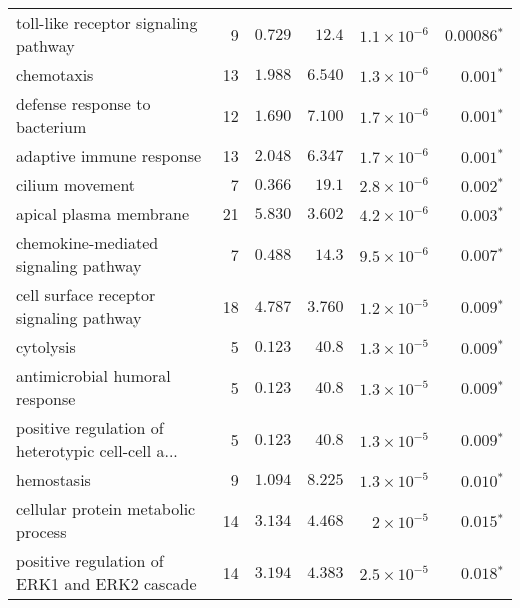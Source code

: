 \documentclass{article}
\begin{document}
\begin{table*}[!ht]
\begin{adjustbox}{width = 1\textwidth}
\begin{tabular}{|l|r|r|r|r|r|}
                toll-like receptor signaling pathway              & 9   & $ 0.729$ & $  12.4$   & $1.1\times 10^{-6}$  & $\bm{0.00086{^*}}$            \\
                chemotaxis                                        & 13  & $ 1.988$ & $ 6.540$ & $1.3\times 10^{-6}$  & $\bm{ 0.001{^*}}$             \\
                defense response to bacterium                     & 12  & $ 1.690$ & $ 7.100$ & $1.7\times 10^{-6}$  & $\bm{ 0.001{^*}}$             \\
                adaptive immune response                          & 13  & $ 2.048$ & $ 6.347$ & $1.7\times 10^{-6}$  & $\bm{ 0.001{^*}}$             \\
                cilium movement                                   & 7   & $ 0.366$ & $  19.1$   & $2.8\times 10^{-6}$  & $\bm{ 0.002{^*}}$             \\
                apical plasma membrane                            & 21  & $ 5.830$ & $ 3.602$ & $4.2\times 10^{-6}$  & $\bm{ 0.003{^*}}$             \\
                chemokine-mediated signaling pathway              & 7   & $ 0.488$ & $  14.3$   & $9.5\times 10^{-6}$  & $\bm{ 0.007{^*}}$             \\
                cell surface receptor signaling pathway           & 18  & $ 4.787$ & $ 3.760$ & $1.2\times 10^{-5}$ & $\bm{ 0.009{^*}}$ \\
                cytolysis                                         & 5   & $ 0.123$ & $  40.8$   & $1.3\times 10^{-5}$  & $\bm{ 0.009{^*}}$             \\
                antimicrobial humoral response                    & 5   & $ 0.123$ & $  40.8$   & $1.3\times 10^{-5}$  & $\bm{ 0.009{^*}}$             \\
                positive regulation of heterotypic cell-cell a... & 5   & $ 0.123$ & $  40.8$   & $1.3\times 10^{-5}$ & $\bm{ 0.009{^*}}$ \\
                hemostasis                                        & 9   & $ 1.094$ & $ 8.225$ & $1.3\times 10^{-5}$  & $\bm{ 0.010{^*}}$             \\
                cellular protein metabolic process                & 14  & $ 3.134$ & $ 4.468$ & $ 2\times 10^{-5}$   & $\bm{ 0.015{^*}}$             \\
                positive regulation of ERK1 and ERK2 cascade      & 14  & $ 3.194$ & $ 4.383$ & $2.5\times 10^{-5}$ & $\bm{ 0.018{^*}}$ \\

\end{tabular}
\end{adjustbox}
\end{table*}
\end{document}
